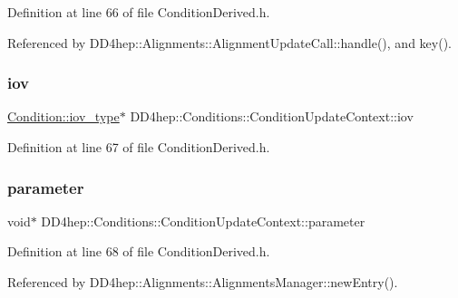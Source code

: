 Definition at line 66 of file Condition\+Derived.\+h.



Referenced by D\+D4hep\+::\+Alignments\+::\+Alignment\+Update\+Call\+::handle(), and key().

\hypertarget{class_d_d4hep_1_1_conditions_1_1_condition_update_context_acdeb1015159a6df55df3c3e614651d4e}{}\label{class_d_d4hep_1_1_conditions_1_1_condition_update_context_acdeb1015159a6df55df3c3e614651d4e} 
\subsubsection{\texorpdfstring{iov}{iov}}
{\footnotesize\ttfamily \hyperlink{class_d_d4hep_1_1_conditions_1_1_condition_ad84300e226b2085ec5e9db7f47be5539}{Condition\+::iov\+\_\+type}$\ast$ D\+D4hep\+::\+Conditions\+::\+Condition\+Update\+Context\+::iov}



Definition at line 67 of file Condition\+Derived.\+h.

\hypertarget{class_d_d4hep_1_1_conditions_1_1_condition_update_context_adad82de460a5c71b568e73e2f76923ba}{}\label{class_d_d4hep_1_1_conditions_1_1_condition_update_context_adad82de460a5c71b568e73e2f76923ba} 
\subsubsection{\texorpdfstring{parameter}{parameter}}
{\footnotesize\ttfamily void$\ast$ D\+D4hep\+::\+Conditions\+::\+Condition\+Update\+Context\+::parameter}



Definition at line 68 of file Condition\+Derived.\+h.



Referenced by D\+D4hep\+::\+Alignments\+::\+Alignments\+Manager\+::new\+Entry().

\hypertarget{class_d_d4hep_1_1_conditions_1_1_condition_update_context_afec7d015ccb53ab2c84eec000846b15d}{}\label{class_d_d4hep_1_1_conditions_1_1_condition_update_context_afec7d015ccb53ab2c84eec000846b15d} 

